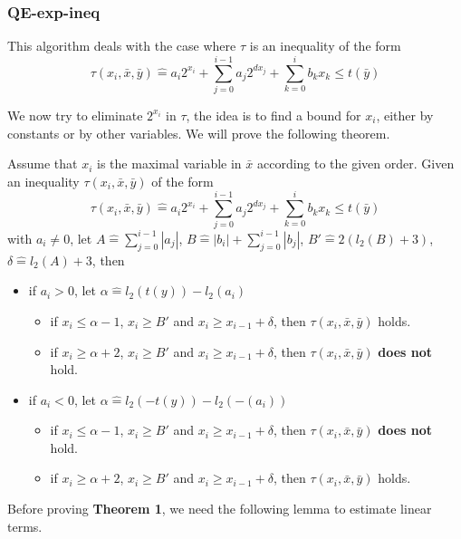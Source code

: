 \documentclass[runningheads]{llncs}
\newcommand{\Def}{\hat{=}}
\begin{document}
\subsubsection{QE-exp-ineq}

This algorithm deals with the case where $\tau$ is an inequality of the form 
$$\tau(x_i,\bar{x},\bar{y}) \Def  a_i 2^{x_i}+\sum_{j=0}^{i-1} a_j2^{d x_j} + \sum_{k=0}^{i}b_k x_k \le t(\bar{y})$$

We now try to eliminate $2^{x_i}$ in $\tau$, the idea is to find a bound for $x_i$, 
either by constants or by other variables.
We will prove the following theorem.

\begin{theorem} \label{thm:exp-ineq}
Assume that $x_i$ is the maximal variable in $\bar{x}$ according to the given order. 
Given an inequality $\tau(x_i,\bar{x},\bar{y})$ of the form %
$$\tau(x_i,\bar{x},\bar{y}) \Def  a_i 2^{x_i}+\sum_{j=0}^{i-1} a_j2^{d x_j} + \sum_{k=0}^{i}b_k x_k \le t(\bar{y})$$
with $a_i \neq 0$, 
let $A\Def \sum_{j=0}^{i-1}|a_j|$, 
$B\Def |b_i| + \sum_{j=0}^{i-1}|b_j|$, 
$B'\Def 2(l_2(B)+3)$,
$\delta\Def  l_2(A)+3$, then 
\begin{itemize}
    \item if $a_i > 0$, let $\alpha \Def l_2(t(y))-l_2(a_i)$
    \begin{itemize}
        \item if $x_i \le \alpha -1$, $x_i \ge B'$ and $x_{i} \ge x_{i-1} +\delta $, then $\tau(x_i,\bar{x},\bar{y})$ holds.
        \item if $x_i \ge \alpha +2$, $x_i \ge B'$ and $x_{i} \ge x_{i-1} +\delta $, then $\tau(x_i,\bar{x},\bar{y})$ \textbf{does not} hold.
    \end{itemize}
    \item if $a_i < 0$, let $\alpha \Def l_2(-t(y))-l_2(-(a_i))$
    \begin{itemize}
        \item if $x_i \le \alpha -1$, $x_i \ge B'$ and $x_{i} \ge x_{i-1} +\delta $, then $\tau(x_i,\bar{x},\bar{y})$ \textbf{does not} hold.
        \item if $x_i \ge \alpha +2$, $x_i \ge B'$ and $x_{i} \ge x_{i-1} +\delta $, then $\tau(x_i,\bar{x},\bar{y})$ holds.
    \end{itemize}
\end{itemize}
\end{theorem}

Before proving \textbf{Theorem 1}, we need  the following lemma to estimate linear terms.
\end{document}

